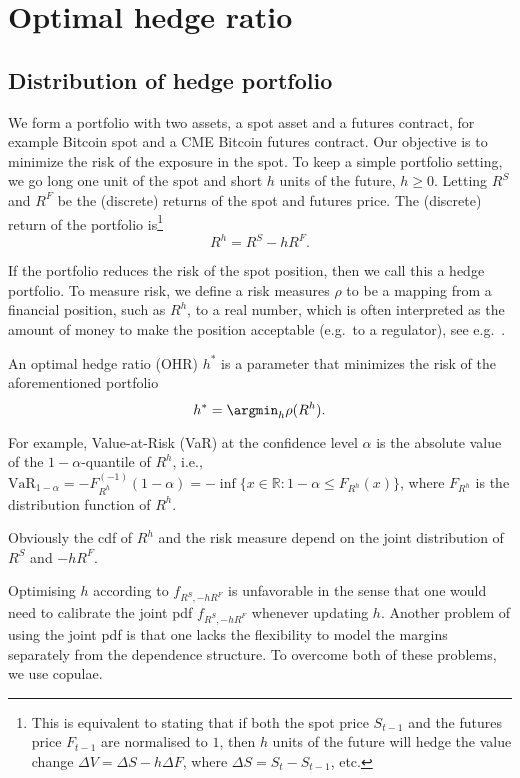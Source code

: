 \section{Optimal hedge ratio}\label{sec:optimal-hedge-ratio}

\subsection{Distribution of hedge portfolio}\label{subsec:DHP}
We form a portfolio with two assets, a spot asset and a futures
contract, for example Bitcoin spot and a CME Bitcoin futures contract.
Our objective is to minimize the risk of the exposure in the spot.
To keep a simple portfolio setting, we go long one unit of the spot
and short $h$ units of the future, $h \geq 0$.
Letting $R^S$ and $R^F$ be the (discrete) returns of the spot and
futures price. The (discrete) return of the portfolio is\footnote{%
This is equivalent to stating that if both the spot price $S_{t-1}$
and the futures price $F_{t-1}$ are 
normalised to $1$, then $h$ units of the future will hedge the value
change $\Delta V = \Delta S - h \Delta F$, where $\Delta S =
S_t-S_{t-1}$, etc.
  }
\begin{equation*}
R^h = R^S -h R^F.
\end{equation*}


If the portfolio reduces the risk of the spot position, then
we call this a hedge portfolio.
To measure risk, we define a risk measures $\rho$ to be a mapping from
a financial position, such as $R^h$, to a real number, which is often
interpreted as the amount of money to make the position acceptable
(e.g.\ to a regulator), see e.g.\ \citep{Foellmer2002}.

An optimal hedge ratio (OHR) $h^*$ is a parameter that
minimizes the risk of the aforementioned portfolio
\begin{equation*}
h^* = \argmin_h \rho(R^h).
\end{equation*}

For example, Value-at-Risk (VaR) at the confidence level $\alpha$ is
the absolute value of the $1-\alpha$-quantile of $R^h$, i.e., $\text{VaR}_{1-\alpha} =
-F_{R^h}^{(-1)}(1-\alpha) = -\inf\{x \in \mathbb{R}: 1-\alpha \leq
F_{R^h}(x) \}$, where $F_{R^h}$ is the distribution function of
$R^h$.

Obviously the cdf of $R^h$ and the risk measure depend on the joint distribution of $R^S$ and $-hR^F$.

Optimising $h$ according to $f_{R^S,-hR^F}$ is unfavorable in the
sense that one would need to calibrate the joint pdf $f_{R^S,-hR^F}$
whenever updating $h$.
Another problem of using the joint pdf is that one lacks the
flexibility to model the margins separately from the dependence structure.
To overcome both of these problems, we use copulae.

